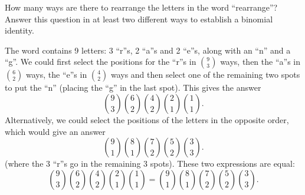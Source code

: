 \begin{questions}
\begin{answer}
	\end{answer}
	
	
	
\question How many ways are there to rearrange the letters in the word ``rearrange''? 	Answer this question in at least two different ways to establish a binomial identity.

	\begin{answer}
		The word contains 9 letters: 3 ``r''s, 2 ``a''s and 2 ``e''s, along with an ``n'' and a ``g''.  We could first select the positions for the ``r''s in ${9 \choose 3}$ ways, then the ``a''s in ${6 \choose 2}$ ways, the ``e''s in ${4 \choose 2}$ ways and then select one of the remaining two spots to put the ``n'' (placing the ``g'' in the last spot).  This gives the answer
		\[{9 \choose 3}{6 \choose 2}{4 \choose 2}{2\choose 1}{1\choose 1}.\]
		Alternatively, we could select the positions of the letters in the opposite order, which would give an answer
		\[{9 \choose 1}{8\choose 1}{7 \choose 2}{5\choose 2}{3\choose 3}.\]
		(where the 3 ``r''s go in the remaining 3 spots).  These two expressions are equal:
		\[{9 \choose 3}{6 \choose 2}{4 \choose 2}{2\choose 1}{1\choose 1} = {9 \choose 1}{8\choose 1}{7 \choose 2}{5\choose 2}{3\choose 3}.\]
	\end{answer}
	

\end{questions}

